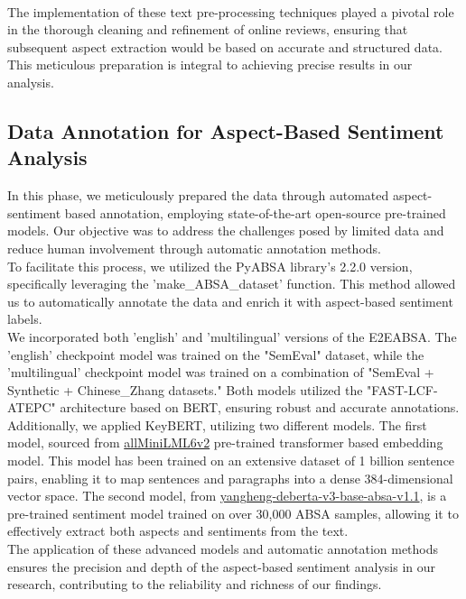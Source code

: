 \\
The implementation of these text pre-processing techniques played a pivotal role in the thorough cleaning and refinement of online reviews, ensuring that subsequent aspect extraction would be based on accurate and structured data. This meticulous preparation is integral to achieving precise results in our analysis.
\subsection{Data Annotation for Aspect-Based Sentiment Analysis}
In this phase, we meticulously prepared the data through automated aspect-sentiment based annotation, employing state-of-the-art open-source pre-trained models. Our objective was to address the challenges posed by limited data and reduce human involvement through automatic annotation methods.
\\
To facilitate this process, we utilized the PyABSA library's 2.2.0 version, specifically leveraging the 'make\_ABSA\_dataset' function. This method allowed us to automatically annotate the data and enrich it with aspect-based sentiment labels.
\\
We incorporated both 'english' and 'multilingual' versions of the E2EABSA. The 'english' checkpoint model was trained on the "SemEval" dataset, while the 'multilingual' checkpoint model was trained on a combination of "SemEval + Synthetic + Chinese\_Zhang datasets." Both models utilized the "FAST-LCF-ATEPC" architecture based on BERT, ensuring robust and accurate annotations.
\\
Additionally, we applied KeyBERT, utilizing two different models. The first model, sourced from \href{https://huggingface.co/sentence-transformers/all-MiniLM-L6-v2}{allMiniLML6v2} pre-trained transformer based embedding model. This model has been trained on an extensive dataset of 1 billion sentence pairs, enabling it to map sentences and paragraphs into a dense 384-dimensional vector space. The second model, from \href{https://huggingface.co/yangheng/deberta-v3-base-absa-v1.1}{yangheng-deberta-v3-base-absa-v1.1}, is a pre-trained sentiment model trained on over 30,000 ABSA samples, allowing it to effectively extract both aspects and sentiments from the text.
\\
The application of these advanced models and automatic annotation methods ensures the precision and depth of the aspect-based sentiment analysis in our research, contributing to the reliability and richness of our findings.
